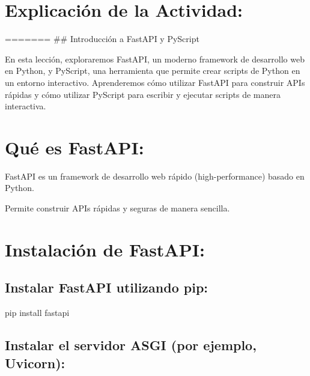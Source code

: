 \documentclass[
  a4paper,
  onepage,
  openany]{scrreprt}
\newenvironment{Shaded}{\begin{snugshade}}{\end{snugshade}}
\newcommand{\ExtensionTok}[1]{\textcolor[rgb]{0.00,0.23,0.31}{#1}}
\newcommand{\NormalTok}[1]{\textcolor[rgb]{0.00,0.23,0.31}{#1}}
\begin{document}
\hypertarget{explicaciuxf3n-de-la-actividad-82}{%
\section{Explicación de la
Actividad:}\label{explicaciuxf3n-de-la-actividad-82}}

======= \#\# Introducción a FastAPI y PyScript

En esta lección, exploraremos FastAPI, un moderno framework de
desarrollo web en Python, y PyScript, una herramienta que permite crear
scripts de Python en un entorno interactivo. Aprenderemos cómo utilizar
FastAPI para construir APIs rápidas y cómo utilizar PyScript para
escribir y ejecutar scripts de manera interactiva.

\hypertarget{quuxe9-es-fastapi-1}{%
\section{Qué es FastAPI:}\label{quuxe9-es-fastapi-1}}

FastAPI es un framework de desarrollo web rápido (high-performance)
basado en Python.

Permite construir APIs rápidas y seguras de manera sencilla.

\hypertarget{instalaciuxf3n-de-fastapi-1}{%
\section{Instalación de FastAPI:}\label{instalaciuxf3n-de-fastapi-1}}

\hypertarget{instalar-fastapi-utilizando-pip-1}{%
\subsection{Instalar FastAPI utilizando
pip:}\label{instalar-fastapi-utilizando-pip-1}}

\begin{Shaded}
\begin{Highlighting}[]
\ExtensionTok{pip}\NormalTok{ install fastapi}
\end{Highlighting}
\end{Shaded}

\hypertarget{instalar-el-servidor-asgi-por-ejemplo-uvicorn-1}{%
\subsection{Instalar el servidor ASGI (por ejemplo,
Uvicorn):}\label{instalar-el-servidor-asgi-por-ejemplo-uvicorn-1}}
\end{document}
